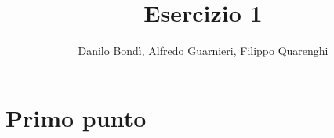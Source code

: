 \documentclass[11pt, titlepage]{article}
\title{\textbf{Esercizio 1}}
\author{Danilo Bondì, Alfredo Guarnieri, Filippo Quarenghi}
\date{}
\begin{document}

%

\section*{Primo punto}


\end{document}
